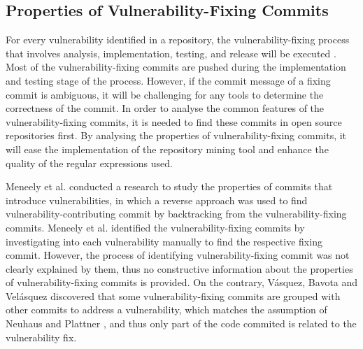\documentclass[12pt, a4paper]{report}
\begin{document}
\subsection{Properties of Vulnerability-Fixing Commits}
For every vulnerability identified in a repository, the vulnerability-fixing process that involves
analysis, implementation, testing, and release will be executed \cite{othmane_2015}. Most of the
vulnerability-fixing commits are pushed during the implementation and testing stage of the process.
However, if the commit message of a fixing commit is ambiguous, it will be challenging for any tools
to determine the correctness of the commit. In order to analyse the common features of the
vulnerability-fixing commits, it is needed to find these commits in open source repositories first.
By analysing the properties of vulnerability-fixing commits, it will ease the implementation of the
repository mining tool and enhance the quality of the regular expressions used.

Meneely et al. \cite{meneely_2013} conducted a research to study the properties of commits that
introduce vulnerabilities, in which a reverse approach was used to find vulnerability-contributing
commit by backtracking from the vulnerability-fixing commits. Meneely et al. identified the
vulnerability-fixing commits by investigating into each vulnerability manually to find the
respective fixing commit. However, the process of identifying vulnerability-fixing commit was not
clearly explained by them, thus no constructive information about the properties of
vulnerability-fixing commits is provided. On the contrary, V{\'a}squez, Bavota and Vel{\'a}squez
\cite{linares_2017} discovered that some vulnerability-fixing commits are grouped with other commits
to address a vulnerability, which matches the assumption of Neuhaus and Plattner
\cite{neuhaus_2013}, and thus only part of the code commited is related to the vulnerability fix.
\end{document}
